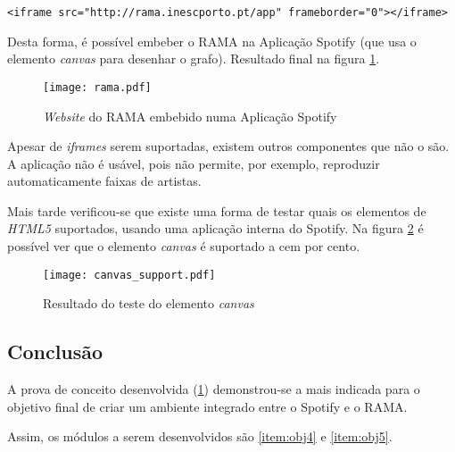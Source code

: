     \begin{lstlisting}[caption={Elemento \emph{iframe} que embebe o \emph{website} do RAMA na aplicação}]
      <iframe src="http://rama.inescporto.pt/app" frameborder="0"></iframe>
    \end{lstlisting}

    Desta forma, é possível embeber o RAMA na Aplicação Spotify (que usa o elemento \emph{canvas} para desenhar o grafo).
    Resultado final na figura \ref{fig:rama_spotifyed}.

    \begin{figure}
      \begin{center}
        \texttt{[image: rama.pdf]}
      \end{center}
      \caption{\emph{Website} do RAMA embebido numa Aplicação Spotify}
      \label{fig:rama_spotifyed}
    \end{figure}

    Apesar de \emph{iframes} serem suportadas, existem outros componentes que não o são.
    A aplicação não é usável, pois não permite, por exemplo, reproduzir automaticamente faixas de artistas.

    Mais tarde verificou-se que existe uma forma de testar quais os elementos de \emph{HTML5} suportados, usando uma aplicação interna do Spotify.
    Na figura \ref{fig:canvas_support} é possível ver que o elemento \emph{canvas} é suportado a cem por cento.

    \begin{figure}
       \begin{center}
         \texttt{[image: canvas\_support.pdf]}
       \end{center}
       \caption{Resultado do teste do elemento \emph{canvas}}
       \label{fig:canvas_support}
     \end{figure}


  \subsection{Conclusão} %
  \label{sub:conclusao}
  
    A prova de conceito desenvolvida (\ref{fig:rama_spotifyed}) demonstrou-se a mais indicada para o objetivo final de criar um ambiente integrado entre o Spotify e o RAMA.

    Assim, os módulos a serem desenvolvidos são \ref{item:obj4} e \ref{item:obj5}.

